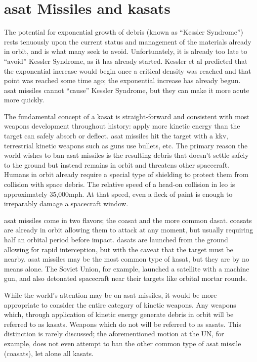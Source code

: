 \section*{\ac{asat} Missiles and \acfp{kasat}}

The potential for exponential growth of debris (known as ``Kessler
Syndrome'') rests tenuously upon the current status and management of
the materials already in orbit, and is what many seek to avoid.
Unfortunately, it is already too late to ``avoid'' Kessler Syndrome,
as it has already started.  Kessler et al predicted that the
exponential increase would begin once a critical density was reached
and that point was reached some time ago; the exponential increase has
already begun.\cite[p14]{kessler-reunion} \ac{asat} missiles cannot
``cause'' Kessler Syndrome, but they can make it more acute more
quickly.\cite[p10]{kessler-reunion}

The fundamental concept of a \ac{kasat} is straight-forward and
consistent with most weapons development throughout history: apply
more kinetic energy than the target can safely absorb or deflect.
\ac{asat} missiles hit the target with a \ac{kkv}, terrestrial kinetic
weapons such as guns use bullets, etc.  The primary reason the world
wishes to ban \ac{asat} missiles is the resulting debris that doesn't
settle safely to the ground but instead remains in orbit and threatens
other spacecraft.  Humans in orbit already require a special type of
shielding to protect them from collision with space
debris.\cite{whipple-me-spacecraft} The relative speed of a head-on
collision in \ac{leo} is approximately 35,000mph.  At that speed, even
a fleck of paint is enough to irreparably damage a spacecraft
window.\cite{iss-throwing-stones}

\ac{asat} missiles come in two flavors; the \acf{coasat} and the more
common \acf{dasat}.\cite{brian} \acp{coasat} are already in orbit
allowing them to attack at any moment, but usually requiring half an
orbital period before impact.\cite{brian} \acp{dasat} are launched
from the ground allowing for rapid interception, but with the caveat
that the target must be nearby.\cite{asat-history} \ac{asat} missiles
may be the most common type of \ac{kasat}, but they are by no means
alone.  The Soviet Union, for example, launched a satellite with a
machine gun, and also detonated spacecraft near their targets like
orbital mortar rounds.\cite{brian}

While the world's attention may be on \ac{asat} missiles, it would be
more appropriate to consider the entire category of kinetic weapons.
Any weapons which, through application of kinetic energy generate
debris in orbit will be referred to as \acp{kasat}.  Weapons which do
not will be referred to as \acp{sasat}.  This distinction is rarely
discussed; the aforementioned motion at the UN, for example, does not
even attempt to ban the other common type of \ac{asat} missile
(\acp{coasat}), let alone all \acp{kasat}.\cite{un-asat-me-not}

